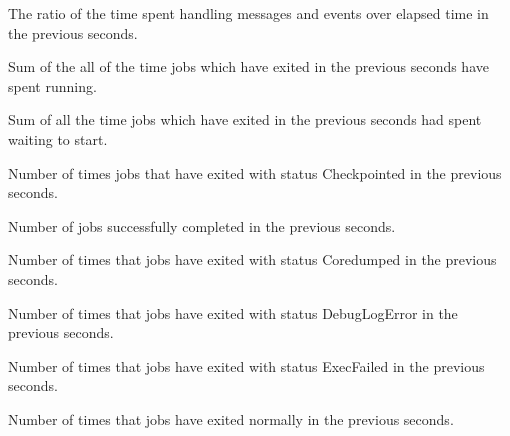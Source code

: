 \begin{description}
\item[\AdAttr{RecentDaemonCoreDutyCycle}:] The ratio of the time spent handling messages and events over elapsed time 
  in the previous  seconds.

\item[\AdAttr{RecentJobsAccumRunningTime}:] Sum of the all of the time jobs which have exited
  in the previous  seconds have spent running.

\item[\AdAttr{RecentJobsAccumTimeToStart}:] Sum of all the time jobs which have exited
  in the previous  seconds had spent waiting to start.

\item[\AdAttr{RecentJobsCheckpointed}:] Number of times jobs that have exited with status Checkpointed
  in the previous  seconds.

\item[\AdAttr{RecentJobsCompleted}:] Number of jobs successfully completed
  in the previous  seconds.

\item[\AdAttr{RecentJobsCoredumped}:] Number of times that jobs have exited with status Coredumped
  in the previous  seconds.

\item[\AdAttr{RecentJobsDebugLogError}:] Number of times that jobs have exited with status DebugLogError
  in the previous  seconds.

\item[\AdAttr{RecentJobsExecFailed}:] Number of times that jobs have exited with status ExecFailed
  in the previous  seconds.

\item[\AdAttr{RecentJobsExited}:] Number of times that jobs have exited normally
  in the previous  seconds.


\end{description}
